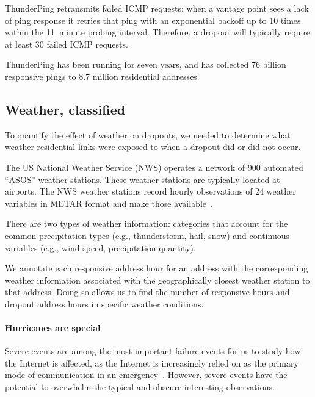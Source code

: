 ThunderPing retransmits failed ICMP requests: when a vantage point sees a
lack of ping response it retries that ping with an exponential backoff up to 10
times within the 11~minute probing interval.  Therefore, a dropout will typically require
at least 30 failed ICMP requests.

ThunderPing has been running for seven years, and has
collected 76 billion responsive pings to 8.7 million
residential addresses.
 
\subsection{Weather, classified}

To quantify the effect of weather on dropouts, we needed to determine
what weather residential links were exposed to when a dropout did or did not
occur.

The US National Weather Service (NWS) operates a 
network of 900 automated ``ASOS'' weather stations.
%
These weather stations are typically located at airports.
%
The NWS weather stations record hourly observations of 24 weather
variables in METAR format and make those available~\cite{metar-ftp}.
%
%
 
There are two types of weather information: categories that
account for the common precipitation types (e.g.,
thunderstorm, hail, snow) and continuous variables (e.g.,
wind speed, precipitation quantity).

We annotate each responsive address hour for an address with the
corresponding weather information associated with the geographically
closest weather station to that address. Doing so allows us to find
the number of responsive hours and dropout address hours in specific
weather conditions. 

\paragraph{Hurricanes are special}
%
Severe events are among the most important failure events for us to study how the
Internet is affected, as the Internet is increasingly relied on as the primary
mode of communication in an emergency~\cite{emergency-voip-fcc}.
However, severe events have the potential to overwhelm the typical and
obscure interesting observations.

